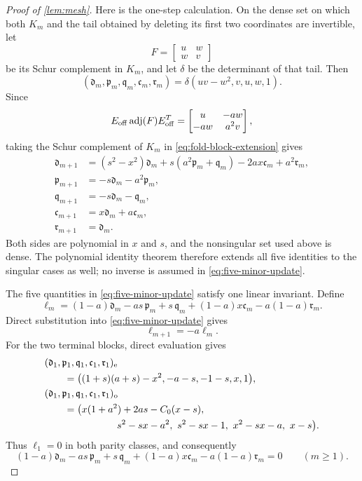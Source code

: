 \documentclass[review,hidelinks,onefignum,onetabnum]{siamart251216}
\begin{document}
\begin{proof}[Proof of \cref{lem:mesh}]
Here is the one-step calculation.  On the dense set on which both
\(K_m\) and the tail obtained by deleting its first two coordinates
are invertible, let
\[
 F=\begin{bmatrix}u&w\\w&v\end{bmatrix}
\]
be its Schur complement in \(K_m\), and let \(\delta\) be the
determinant of that tail.  Then
\[
 (\mathfrak d_m,\mathfrak p_m,\mathfrak q_m,\mathfrak c_m,\mathfrak r_m)
 =\delta(uv-w^2,v,u,w,1).
\]
Since
\[
 E_{\rm off}\operatorname{adj}(F)E_{\rm off}^T
 =
 \begin{bmatrix}u&-aw\\-aw&a^2v\end{bmatrix},
\]
taking the Schur complement of \(K_m\) in
\eqref{eq:fold-block-extension} gives
\begin{equation}\label{eq:five-minor-update}
\begin{aligned}
 \mathfrak d_{m+1}
 &= (s^2-x^2)\mathfrak d_m
    +s(a^2\mathfrak p_m+\mathfrak q_m)
    -2ax\mathfrak c_m+a^2\mathfrak r_m,\\
 \mathfrak p_{m+1}&=-s\mathfrak d_m-a^2\mathfrak p_m,\\
 \mathfrak q_{m+1}&=-s\mathfrak d_m-\mathfrak q_m,\\
 \mathfrak c_{m+1}&=x\mathfrak d_m+a\mathfrak c_m,\\
 \mathfrak r_{m+1}&=\mathfrak d_m.
\end{aligned}
\end{equation}
Both sides are polynomial in \(x\) and \(s\), and the nonsingular set used
above is dense.  The polynomial identity theorem therefore extends all five
identities to the singular cases as well; no inverse is assumed in
\eqref{eq:five-minor-update}.

The five quantities in \eqref{eq:five-minor-update} satisfy one linear
invariant.  Define
\[
 \ell_m=(1-a)\mathfrak d_m-as\,\mathfrak p_m+s\,\mathfrak q_m
       +(1-a)x\mathfrak c_m-a(1-a)\mathfrak r_m.
\]
Direct substitution into \eqref{eq:five-minor-update} gives
\[
 \ell_{m+1}=-a\ell_m.
\]
For the two terminal blocks, direct evaluation gives
\[
\begin{aligned}
&(\mathfrak d_1,\mathfrak p_1,\mathfrak q_1,\mathfrak c_1,\mathfrak r_1)_{\mathrm e}\\
&\qquad=\bigl((1+s)(a+s)-x^2,-a-s,-1-s,x,1\bigr),\\
&(\mathfrak d_1,\mathfrak p_1,\mathfrak q_1,\mathfrak c_1,\mathfrak r_1)_{\mathrm o}\\
&\qquad=\bigl(x(1+a^2)+2as-C_0(x-s),\\
&\hspace{26mm}s^2-sx-a^2,\ s^2-sx-1,\ x^2-sx-a,\ x-s\bigr).
\end{aligned}
\]
Thus \(\ell_1=0\) in both parity classes, and consequently
\begin{equation}\label{eq:fold-minor-invariant}
 (1-a)\mathfrak d_m-as\,\mathfrak p_m+s\,\mathfrak q_m
 +(1-a)x\mathfrak c_m-a(1-a)\mathfrak r_m=0
 \qquad(m\geq1).
\end{equation}


\end{proof}
\end{document}
